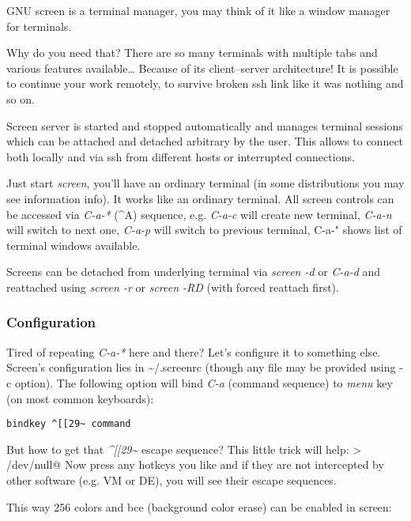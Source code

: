 \documentclass[10pt, a5paper]{article}
\begin{document}
GNU screen is a terminal manager, you may think of it like a window manager for terminals.

Why do you need that? There are so many terminals with multiple tabs and various features available\ldots{} Because of its client–server \linebreak architecture! It is possible to continue your work remotely, to survive broken ssh link like it was nothing and so on.

Screen server is started and stopped automatically and manages terminal sessions which can be attached and detached arbitrary by the user. This allows to connect both locally and via ssh from different hosts or interrupted connections.

Just start \emph{screen}, you'll have an ordinary terminal (in some \linebreak distributions you may see information info). It works like an ordinary terminal. All screen controls can be accessed via \emph{C-a-*} (\^{}A) sequence, e.g. \emph{C-a-c} will create new terminal, \emph{C-a-n} will switch to next one, \emph{C-a-p} will switch to previous terminal, C-a-" shows list of terminal windows available.

Screens can be detached from underlying terminal via \emph{screen -d} or \emph{C-a-d} and reattached using \emph{screen -r} or \emph{screen -RD} (with forced reattach first).

\subsubsection*{Configuration}

Tired of repeating \emph{C-a-*} here and there? Let's configure it to \linebreak something else. Screen's configuration lies in \~{}/.screenrc (though any file may be provided using -c option). The following option will bind \emph{C-a} (command sequence) to \emph{menu} key (on most common keyboards):

\begin{verbatim}
bindkey ^[[29~ command\end{verbatim}
But how to get that \emph{\^{}[[29\~{}} escape sequence? This little trick will help:
\verb@cat > /dev/null@
Now press any hotkeys you like and if they are not intercepted by other software (e.g. VM or DE), you will see their escape sequences.

This way 256 colors and bce (background color erase) can be enabled in screen:
\end{document}

